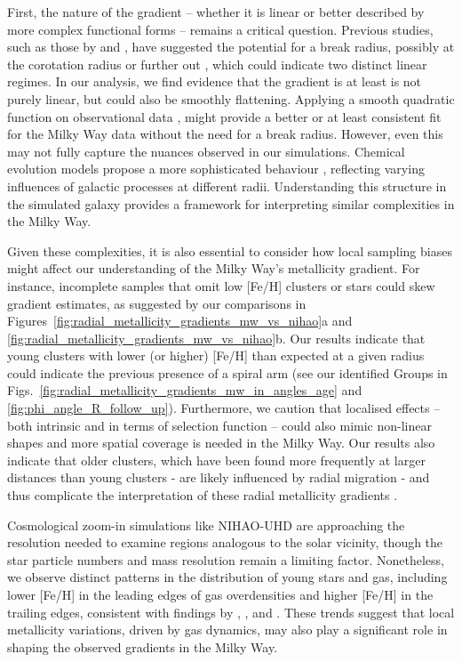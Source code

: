 \documentclass[twocolumn,apj,numberedappendix,appendixfloats]{openjournal}
\begin{document}
\begin{CJK*}{UTF8}{gbsn}
First, the nature of the gradient -- whether it is linear or better described by more complex functional forms -- remains a critical question. Previous studies, such as those by \citet{Lepine2011} and \citet{Donor2020}, have suggested the potential for a break radius, possibly at the corotation radius or further out \citep{Scarano2013}, which could indicate two distinct linear regimes. In our analysis, we find evidence that the gradient is at least is not purely linear, but could also be smoothly flattening. Applying a smooth quadratic function on observational data \citep{Yong2012, Andrievsky2004, Genovali2014}, might provide a better or at least consistent fit for the Milky Way data without the need for a break radius. However, even this may not fully capture the nuances observed in our simulations. Chemical evolution models propose a more sophisticated behaviour \citep[e.g.][]{Chiappini2001, Kubryk2015, Palla2024}, reflecting varying influences of galactic processes at different radii. Understanding this structure in the simulated galaxy provides a framework for interpreting similar complexities in the Milky Way.

Given these complexities, it is also essential to consider how local sampling biases might affect our understanding of the Milky Way's metallicity gradient. For instance, incomplete samples that omit low [Fe/H] clusters or stars could skew gradient estimates, as suggested by our comparisons in Figures~\ref{fig:radial_metallicity_gradients_mw_vs_nihao}a and \ref{fig:radial_metallicity_gradients_mw_vs_nihao}b. Our results indicate that young clusters with lower (or higher) [Fe/H] than expected at a given radius could indicate the previous presence of a spiral arm (see our identified Groups in Figs.~\ref{fig:radial_metallicity_gradients_mw_in_angles_age} and \ref{fig:phi_angle_R_follow_up}). Furthermore, we caution that localised effects -- both intrinsic and in terms of selection function -- could also mimic non-linear shapes and more spatial coverage is needed in the Milky Way. Our results also indicate that older clusters, which have been found more frequently at larger distances than young clusters - are likely influenced by radial migration - and thus complicate the interpretation of these radial metallicity gradients \citep{Magrini2009, Lepine2011}.

Cosmological zoom-in simulations like NIHAO-UHD are approaching the resolution needed to examine regions analogous to the solar vicinity, though the star particle numbers and mass resolution remain a limiting factor. Nonetheless, we observe distinct patterns in the distribution of young stars and gas, including lower [Fe/H] in the leading edges of gas overdensities and higher [Fe/H] in the trailing edges, consistent with findings by \citet{Grand2016}, \citet{Ho2017c}, and \citet{Kreckel2019}. These trends suggest that local metallicity variations, driven by gas dynamics, may also play a significant role in shaping the observed gradients in the Milky Way.


\end{CJK*}
\end{document}
